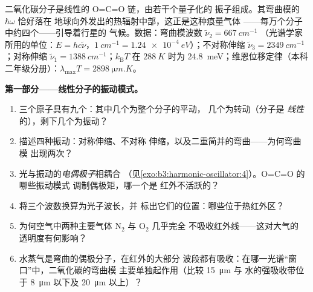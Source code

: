 \begin{problem}\label{pb:b3:harmonic-oscillator:1}
二氧化碳分子是线性的 O=C=O 链，由若干个量子化的
振子组成。其弯曲模的 $\hbar\omega$ 恰好落在
地球向外发出的热辐射中部，这正是这种痕量气体
——每万个分子中约四个——引导着行星的
气候。数据：弯曲模波数 $\tilde\nu_2 = \qty{667}{cm^{-1}}$
（光谱学家所用的单位：$E = hc\tilde\nu$，$\qty{1}{cm^{-1}} =
\qty{1.24e-4}{eV}$）；不对称伸缩 $\tilde\nu_3 =
\qty{2349}{cm^{-1}}$；对称伸缩 $\tilde\nu_1 =
\qty{1388}{cm^{-1}}$；$k_{\text{B}}T$ 在 $\qty{288}{K}$ 时为
\qty{24.8}{meV}；维恩位移定律（本科二年级分册）：$\lambda_{\max}T =
\qty{2898}{\micro m.K}$。

\medskip\noindent\textbf{第一部分——线性分子的振动模式。}
\begin{enumerate}
  \item 三个原子具有九个：其中几个为整个分子的平动，
        几个为转动（分子是
        \emph{线性}的），剩下几个为振动？
  \item 描述四种振动：对称伸缩、不对称
        伸缩，以及二重简并的弯曲——为何弯曲模
        出现两次？
  \item 光与振动的\emph{电偶极子}相耦合
        （见\cref{exo:b3:harmonic-oscillator:4}）。O=C=O 的哪些振动模式
        调制偶极矩，哪一个是
        红外不活跃的？
  \item 将三个波数换算为光子波长，并
        标出它们的位置：哪些位于热红外区？
  \item 为何空气中两种主要气体 N$_2$ 与 O$_2$ 几乎完全
        不吸收红外线——这对大气的
        透明度有何影响？
  \item 水蒸气是弯曲的偶极分子，在红外的大部分
        波段都有吸收：在哪一光谱“窗口”中，二氧化碳的弯曲模
        主要单独起作用（比较 \qty{15}{\micro m} 与
        水的强吸收带位于 \qty{8}{\micro m} 以下及
        \qty{20}{\micro m} 以上）？
\end{enumerate}


\end{problem}

